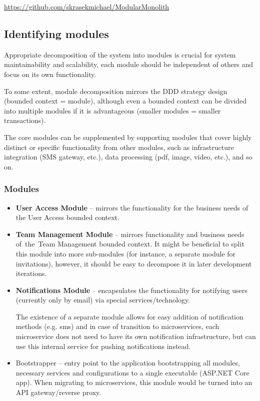 \url{https://github.com/skrasekmichael/ModularMonolith}

\subsection{Identifying modules}
Appropriate decomposition of the system into modules is crucial for system maintainability and scalability, each module should be independent of others and focus on its own functionality.

To some extent, module decomposition mirrors the DDD strategy design (bounded context = module), although even a bounded context can be divided into multiple modules if it is advantageous (smaller modules = smaller transactions).

The core modules can be supplemented by supporting modules that cover highly distinct or specific functionality from other modules, such as infrastructure integration (SMS gateway, etc.), data processing (pdf, image, video, etc.), and so on.

\subsubsection{Modules}
\begin{itemize}
    \item \textbf{User Access Module} -- mirrors the functionality for the business needs of the User Access bounded context.
    
    \item \textbf{Team Management Module} -- mirrors functionality and business needs of~the~Team Management bounded context. It might be beneficial to split this module into more sub-modules (for instance, a separate module for invitations), however, it should be easy to decompose it in later development iterations.

    \item \textbf{Notifications Module} -- encapsulates the functionality for notifying users (currently only by email) via special services/technology.
    
    The existence of a separate module allows for easy addition of notification methods (e.g. sms) and in case of transition to microservices, each microservice does not need to have its own notification infrastructure, but can use this internal service for pushing notifications instead.

    \item Bootstrapper -- entry point to the application bootstrapping all modules, necessary services and configurations to a single executable (ASP.NET Core app). When migrating to microservices, this module would be turned into an API gateway/reverse proxy.
\end{itemize}

